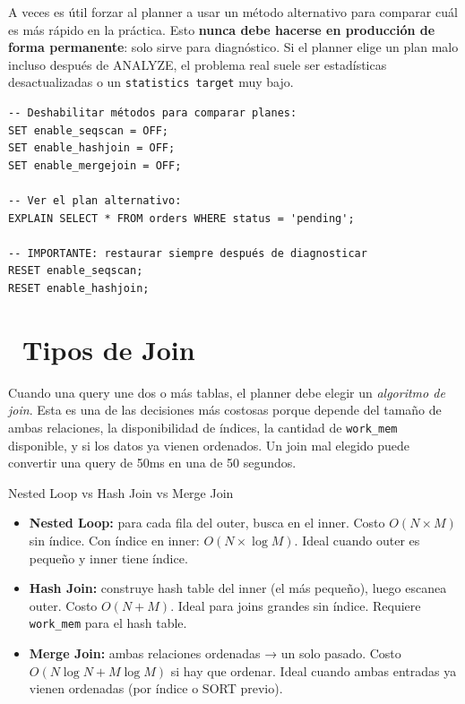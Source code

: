 A veces es útil forzar al planner a usar un método alternativo para comparar cuál es más rápido en la práctica.
Esto \textbf{nunca debe hacerse en producción de forma permanente}: solo sirve para diagnóstico.
Si el planner elige un plan malo incluso después de ANALYZE, el problema real suele ser estadísticas desactualizadas o un \texttt{statistics target} muy bajo.

\begin{lstlisting}[caption={Forcing plan methods (debugging solamente)}]
-- Deshabilitar métodos para comparar planes:
SET enable_seqscan = OFF;
SET enable_hashjoin = OFF;
SET enable_mergejoin = OFF;

-- Ver el plan alternativo:
EXPLAIN SELECT * FROM orders WHERE status = 'pending';

-- IMPORTANTE: restaurar siempre después de diagnosticar
RESET enable_seqscan;
RESET enable_hashjoin;
\end{lstlisting}

\section[Tipos de Join]{~Tipos de Join}

Cuando una query une dos o más tablas, el planner debe elegir un \emph{algoritmo de join}.
Esta es una de las decisiones más costosas porque depende del tamaño de ambas relaciones, la disponibilidad de índices, la cantidad de \texttt{work\_mem} disponible, y si los datos ya vienen ordenados.
Un join mal elegido puede convertir una query de 50ms en una de 50 segundos.

\begin{teoriabox}{Nested Loop vs Hash Join vs Merge Join}
\begin{itemize}
  \item \textbf{Nested Loop:} para cada fila del outer, busca en el inner. Costo $O(N \times M)$ sin índice. Con índice en inner: $O(N \times \log M)$. Ideal cuando outer es pequeño y inner tiene índice.
  \item \textbf{Hash Join:} construye hash table del inner (el más pequeño), luego escanea outer. Costo $O(N + M)$. Ideal para joins grandes sin índice. Requiere \texttt{work\_mem} para el hash table.
  \item \textbf{Merge Join:} ambas relaciones ordenadas → un solo pasado. Costo $O(N \log N + M \log M)$ si hay que ordenar. Ideal cuando ambas entradas ya vienen ordenadas (por índice o SORT previo).
\end{itemize}
\end{teoriabox}

